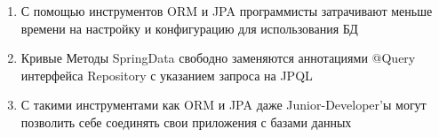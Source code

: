 \begin{enumerate}
	\setlength\itemsep{0em}
	\item С помощью инструментов ORM и JPA программисты затрачивают меньше времени на настройку и конфигурацию для использования БД 
	\item Кривые Методы SpringData свободно заменяются аннотациями @Query интерфейса Repository с указанием запроса на JPQL
	\item С такими инструментами как ORM и JPA даже Junior-Developer’ы могут позволить себе соединять свои приложения с базами данных 
\end{enumerate}